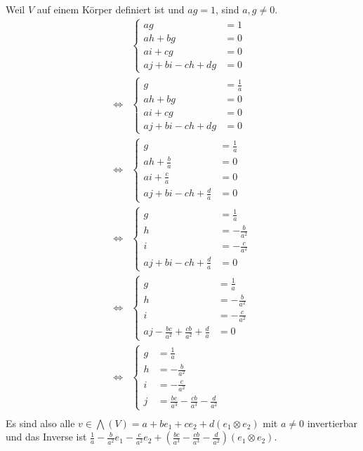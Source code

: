 \documentclass[10pt,a4paper]{article}
\begin{document}
Weil $V$ auf einem Körper definiert ist und $ag = 1$, sind $a, g \ne 0$.
\begin{align*}
& \begin{cases}
ag & = 1\\
ah + bg & = 0\\
ai + cg & = 0\\
aj + bi - ch + dg & = 0
\end{cases}\\
\Leftrightarrow &
\begin{cases}
g & = \frac{1}{a}\\
ah + bg & = 0\\
ai + cg & = 0\\
aj + bi - ch + dg & = 0
\end{cases}\\
\Leftrightarrow &
\begin{cases}
g & = \frac{1}{a}\\
ah + \frac{b}{a} & = 0\\
ai + \frac{c}{a} & = 0\\
aj + bi - ch + \frac{d}{a} & = 0
\end{cases}\\
\Leftrightarrow &
\begin{cases}
g & = \frac{1}{a}\\
h & = -\frac{b}{a^{2}}\\
i & = -\frac{c}{a^{2}}\\
aj + bi - ch + \frac{d}{a} & = 0
\end{cases}\\
\Leftrightarrow &
\begin{cases}
g & = \frac{1}{a}\\
h & = -\frac{b}{a^{2}}\\
i & = -\frac{c}{a^{2}}\\
aj - \frac{bc}{a^{2}} + \frac{cb}{a^{2}} + \frac{d}{a} & = 0
\end{cases}\\
\Leftrightarrow &
\begin{cases}
g & = \frac{1}{a}\\
h & = -\frac{b}{a^{2}}\\
i & = -\frac{c}{a^{2}}\\
j & = \frac{bc}{a^{3}} - \frac{cb}{a^{3}} - \frac{d}{a^{2}}
\end{cases}\\
\end{align*}
Es sind also alle $v \in \bigwedge(V) = a + be_{1} + ce_{2} + d(e_{1} \otimes e_{2})$ mit $a \ne 0$ invertierbar und das Inverse ist $\frac{1}{a} - \frac{b}{a^{2}}e_{1} - \frac{c}{a^{2}}e_{2} + \left( \frac{bc}{a^{3}} - \frac{cb}{a^{3}} - \frac{d}{a^{2}} \right)(e_{1} \otimes e_{2})$.
\end{document}
